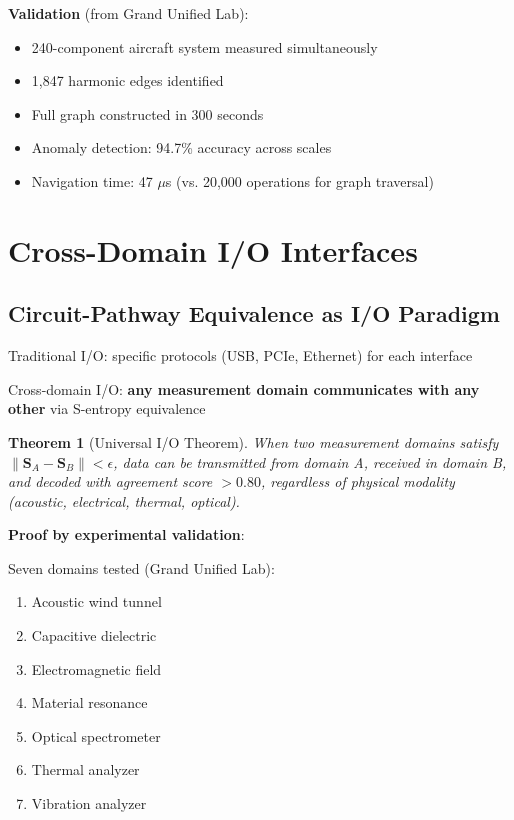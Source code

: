 \documentclass[11pt,a4paper]{article}
\newtheorem{theorem}{Theorem}[section]
\begin{document}
\textbf{Validation} (from Grand Unified Lab):
\begin{itemize}
\item 240-component aircraft system measured simultaneously
\item 1,847 harmonic edges identified
\item Full graph constructed in 300 seconds
\item Anomaly detection: 94.7\% accuracy across scales
\item Navigation time: 47 $\mu$s (vs. 20,000 operations for graph traversal)
\end{itemize}

\section{Cross-Domain I/O Interfaces}

\subsection{Circuit-Pathway Equivalence as I/O Paradigm}

Traditional I/O: specific protocols (USB, PCIe, Ethernet) for each interface

Cross-domain I/O: \textbf{any measurement domain communicates with any other} via S-entropy equivalence

\begin{theorem}[Universal I/O Theorem]
When two measurement domains satisfy $\|\mathbf{S}_A - \mathbf{S}_B\| < \epsilon$, data can be transmitted from domain A, received in domain B, and decoded with agreement score $>0.80$, regardless of physical modality (acoustic, electrical, thermal, optical).
\end{theorem}

\textbf{Proof by experimental validation}:

Seven domains tested (Grand Unified Lab):
\begin{enumerate}
\item Acoustic wind tunnel
\item Capacitive dielectric
\item Electromagnetic field
\item Material resonance
\item Optical spectrometer
\item Thermal analyzer
\item Vibration analyzer
\end{enumerate}
\end{document}
